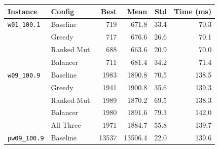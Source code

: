 \documentclass[12pt]{article}
\begin{document}
\begin{table}[H]
\centering
\begin{tabular}{|l|l|r|r|r|r|}
\toprule
\textbf{Instance} & \textbf{Config} & \textbf{Best} & \textbf{Mean} & \textbf{Std} & \textbf{Time (ms)} \\
\midrule
\texttt{w01\_100.1}  & \cellcolor{clrBaseline!25}Baseline  & \cellcolor{clrBaseline!25}719  & \cellcolor{clrBaseline!25}671.8   & \cellcolor{clrBaseline!25}33.4 & \cellcolor{clrBaseline!25}70.3  \\
                     & \cellcolor{clrGreedy!25}Greedy      & \cellcolor{clrGreedy!25}717    & \cellcolor{clrGreedy!25}676.6    & \cellcolor{clrGreedy!25}26.6   & \cellcolor{clrGreedy!25}70.1   \\
                     & \cellcolor{clrRanked!25}Ranked Mut. & \cellcolor{clrRanked!25}688    & \cellcolor{clrRanked!25}663.6    & \cellcolor{clrRanked!25}20.9   & \cellcolor{clrRanked!25}70.0   \\
                     & \cellcolor{clrBalancer!25}Balancer  & \cellcolor{clrBalancer!25}711  & \cellcolor{clrBalancer!25}681.4   & \cellcolor{clrBalancer!25}34.2 & \cellcolor{clrBalancer!25}71.4  \\
\midrule
\texttt{w09\_100.9}  & \cellcolor{clrBaseline!25}Baseline  & \cellcolor{clrBaseline!25}1983 & \cellcolor{clrBaseline!25}1890.8  & \cellcolor{clrBaseline!25}70.5 & \cellcolor{clrBaseline!25}138.5 \\
                     & \cellcolor{clrGreedy!25}Greedy      & \cellcolor{clrGreedy!25}1941   & \cellcolor{clrGreedy!25}1900.8   & \cellcolor{clrGreedy!25}35.6   & \cellcolor{clrGreedy!25}139.3  \\
                     & \cellcolor{clrRanked!25}Ranked Mut. & \cellcolor{clrRanked!25}1989   & \cellcolor{clrRanked!25}1870.2   & \cellcolor{clrRanked!25}69.5   & \cellcolor{clrRanked!25}138.3  \\
                     & \cellcolor{clrBalancer!25}Balancer  & \cellcolor{clrBalancer!25}1980 & \cellcolor{clrBalancer!25}1891.6  & \cellcolor{clrBalancer!25}79.3 & \cellcolor{clrBalancer!25}142.0 \\
                     & \cellcolor{clrAll!25}All Three      & \cellcolor{clrAll!25}1971      & \cellcolor{clrAll!25}1884.7      & \cellcolor{clrAll!25}55.8      & \cellcolor{clrAll!25}139.7     \\
\midrule
\texttt{pw09\_100.9} & \cellcolor{clrBaseline!25}Baseline  & \cellcolor{clrBaseline!25}13537 & \cellcolor{clrBaseline!25}13506.4 & \cellcolor{clrBaseline!25}22.0 & \cellcolor{clrBaseline!25}139.6 \\

\end{tabular}
\end{table}
\end{document}
